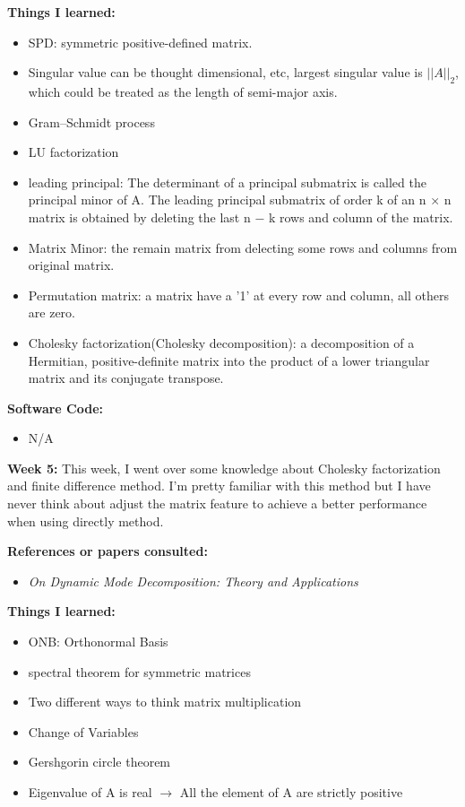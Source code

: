 \documentclass{article}
\begin{document}
\textbf{Things I learned:}
\begin{itemize}
\item SPD: symmetric positive-defined matrix.
\item Singular value can be thought dimensional, etc, largest singular value is $||A||_2$, which could be treated as the length of semi-major axis.
\item Gram–Schmidt process
\item LU factorization
\item leading principal: The determinant of a principal submatrix is called the principal minor of A. The leading principal submatrix of order k of an n × n matrix is obtained by deleting the last n − k rows and column of the matrix. 
\item Matrix Minor: the remain matrix from delecting some rows and columns from original matrix.
\item Permutation matrix: a matrix have a '1' at every row and column, all others are zero.
\item Cholesky factorization(Cholesky decomposition): a decomposition of a Hermitian, positive-definite matrix into the product of a lower triangular matrix and its conjugate transpose.

\end{itemize}

\textbf{Software Code:}
\begin{itemize}
\item N/A
\end{itemize}

\newpage
\textbf{Week 5:}
This week, I went over some knowledge about Cholesky factorization and finite difference method. I'm pretty familiar with this method but I have never think about adjust the matrix feature to achieve a better performance when using directly method.

\textbf{References or papers consulted:}
\begin{itemize}

\item {\em On Dynamic Mode Decomposition: Theory and Applications}

\end{itemize}

\textbf{Things I learned:}
\begin{itemize}
\item ONB: Orthonormal Basis 
\item  spectral theorem for symmetric matrices
\item Two different ways to think matrix multiplication 
\item Change of Variables 
\item Gershgorin circle theorem
\item Eigenvalue of A is real $\xrightarrow{}$ All the element of A are strictly positive

\end{itemize}
\end{document}
